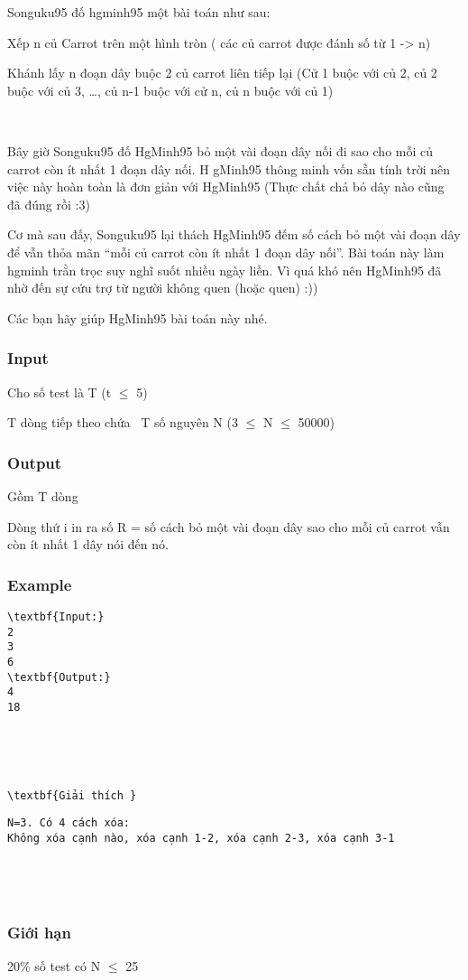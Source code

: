 

Songuku95 đố hgminh95 một bài toán như sau:

Xếp n củ Carrot trên một hình tròn ( các củ carrot được đánh số từ 1 -> n)

Khánh lấy n đoạn dây buộc 2 củ carrot liên tiếp lại (Cử 1 buộc với củ 2, củ 2 buộc với củ 3, …, củ n-1 buộc với cử n, củ n buộc với củ 1)

 

Bây giờ Songuku95 đố HgMinh95 bỏ một vài đoạn dây nối đi sao cho mỗi củ carrot còn ít nhất 1 đoạn dây nối. H gMinh95 thông minh vốn sẵn tính trời nên việc này hoàn toàn là đơn giản với HgMinh95 (Thực chất chả bỏ dây nào cũng đã đúng rồi :3)

Cơ mà sau đấy, Songuku95 lại thách HgMinh95 đếm số cách bỏ một vài đoạn dây để vẫn thỏa mãn “mỗi củ carrot còn ít nhất 1 đoạn dây nối”. Bài toán này làm hgminh trằn trọc suy nghĩ suốt nhiều ngày liền. Vì quá khó nên HgMinh95 đã nhờ đến sự cứu trợ từ người không quen (hoặc quen) :))

Các bạn hãy giúp HgMinh95 bài toán này nhé.

\subsubsection{Input}

Cho số test là T (t  $\le$  5)

T dòng tiếp theo chứa  T số nguyên N (3  $\le$  N  $\le$  50000)

\subsubsection{Output}

Gồm T dòng

Dòng thứ i in ra số R = số cách bỏ một vài đoạn dây sao cho mỗi củ carrot vẫn còn ít nhất 1 dây nói đến nó.

\subsubsection{Example}
\begin{verbatim}
\textbf{Input:}
2
3
6
\textbf{Output:}  
4
18\end{verbatim}

 

 
\begin{verbatim}
\textbf{Giải thích }\end{verbatim}
\begin{verbatim}
N=3. Có 4 cách xóa:
Không xóa cạnh nào, xóa cạnh 1-2, xóa cạnh 2-3, xóa cạnh 3-1 \end{verbatim}
\begin{verbatim}
 \end{verbatim}
\begin{verbatim}
 \end{verbatim}

\subsubsection{Giới hạn}

20\% số test có N  $\le$  25  
